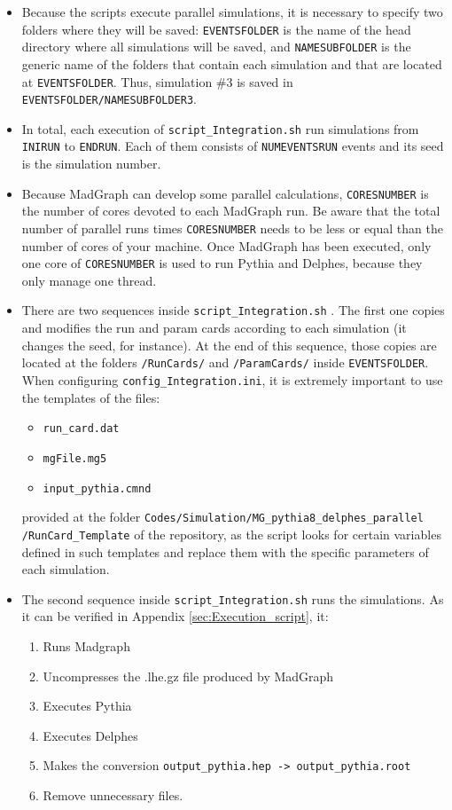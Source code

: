 \documentclass[12pt, oneside]{book}              %
\begin{document}
\begin{itemize}
\item Because the scripts execute parallel simulations, it
is necessary to specify two folders where they will be saved:
\texttt{EVENTSFOLDER} is the name of the head directory where all
simulations will be saved, and \texttt{NAMESUBFOLDER} is the generic
name of the folders that contain each simulation and that are 
located at \texttt{EVENTSFOLDER}. Thus, simulation \#3 is saved in 
\texttt{EVENTSFOLDER/NAMESUBFOLDER3}.

\item In total, each execution of \texttt{script\_Integration.sh} run
simulations from \texttt{INIRUN} to \texttt{ENDRUN}. Each of them
consists of \texttt{NUMEVENTSRUN} events and its seed is the simulation
number.

\item Because MadGraph can develop some parallel calculations, 
\texttt{CORESNUMBER} is the number of cores devoted to each MadGraph
run. Be aware that the total number of parallel runs times \texttt{CORESNUMBER}
needs to be less or equal than the number of cores of your machine. 
Once MadGraph has been executed, only one core of \texttt{CORESNUMBER}
is used to run Pythia and Delphes, because they only manage
one thread.

\item There are two sequences inside \texttt{script\_Integration.sh} . The
first one copies and modifies the run and param cards according to
each simulation (it changes the seed, for instance). At the end of this
sequence, those copies are located at the folders \texttt{/RunCards/} and
\texttt{/ParamCards/} inside \texttt{EVENTSFOLDER}. When configuring
\texttt{config\_Integration.ini}, it is extremely important to use the 
templates of the files:
\begin{itemize}
\item \texttt{run\_card.dat}
\item \texttt{mgFile.mg5}
\item \texttt{input\_pythia.cmnd}
\end{itemize}
provided at the folder \texttt{Codes/Simulation/MG\_pythia8\_delphes\_parallel}
\texttt{/RunCard\_Template} of the repository, as the script looks for
certain variables defined in such templates and replace them with
the specific parameters of each simulation.

\item The second sequence inside \texttt{script\_Integration.sh} runs the
simulations. As it can be verified in Appendix \ref{sec:Execution_script},
it:
\begin{enumerate}
\item Runs Madgraph
\item Uncompresses the .lhe.gz file produced by MadGraph
\item Executes Pythia
\item Executes Delphes
\item Makes the conversion \texttt{output\_pythia.hep -> output\_pythia.root}
\item Remove unnecessary files.
\end{enumerate}


\end{itemize}
\end{document}
